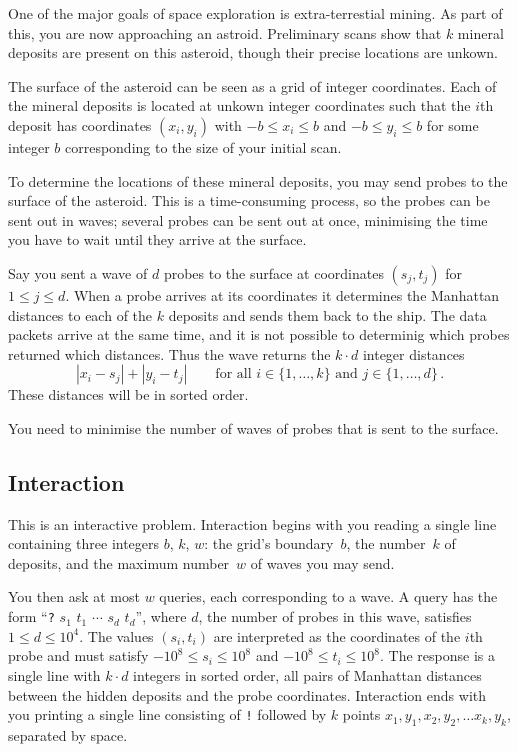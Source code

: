 
One of the major goals of space exploration is extra-terrestial mining. 
As part of this, you are now approaching an astroid. 
Preliminary scans show that $k$ mineral deposits are present on this asteroid, though their precise locations are unkown.

\medskip

The surface of the asteroid can be seen as a grid of integer coordinates.
Each of the mineral deposits is located at unkown integer coordinates such that the $i$th deposit has coordinates $(x_i, y_i)$ with  
$-b \le x_i \le b$ and $-b\le y_i \le b$ %
for some integer $b$ corresponding to the size of your initial scan.

To determine the locations of these mineral deposits, you may send probes to the surface of the asteroid. 
This is a time-consuming process, so the probes can be sent out in waves;
several probes can be sent out at once, minimising the time you have to wait until they arrive at the surface.

Say you sent a wave of $d$ probes to the surface at coordinates $(s_j,t_j)$ for $1\leq j\leq d$.
When a probe arrives at its coordinates it determines the Manhattan distances to each of the $k$ deposits and sends them back to the ship. 
The data packets arrive at the same time, and it is not possible to determinig which probes returned which distances. 
Thus the wave returns the $k\cdot d$ integer distances
\[|x_i-s_j| + |y_i - t_j| \qquad\text{for all } i \in \{1,\ldots,k\} \text{ and } j \in\{ 1,\ldots,d\}\,.\]
These distances will be in sorted order.

You need to minimise the number of waves of probes that is sent to the surface.

\subsection*{Interaction}

This is an interactive problem.
Interaction begins with you reading a single line containing three integers $b$, $k$, $w$:
the grid's boundary~$b$,
the number~$k$ of deposits,
and the maximum number~$w$ of waves you may send.

You then ask at most $w$ queries, each corresponding to a wave.
A query has the form ``\texttt{?} $s_1$ $t_1$ $\cdots$ $s_d$ $t_d$'', where $d$, the number of probes in this wave, satisfies
$1\leq d\leq 10^4$. %
The values $(s_i,t_i)$ are interpreted as the coordinates of the $i$th probe and must satisfy
$-10^8 \leq s_i \leq 10^8$ and $-10^8 \leq t_i \leq 10^8$. %
The response is a single line with $k \cdot d$ integers in sorted order, all pairs of Manhattan distances between the hidden deposits and the probe coordinates.
Interaction ends with you printing a single line consisting of \texttt{!} followed by $k$ points $x_1, y_1, x_2, y_2, \ldots x_k, y_k$, separated by space.

